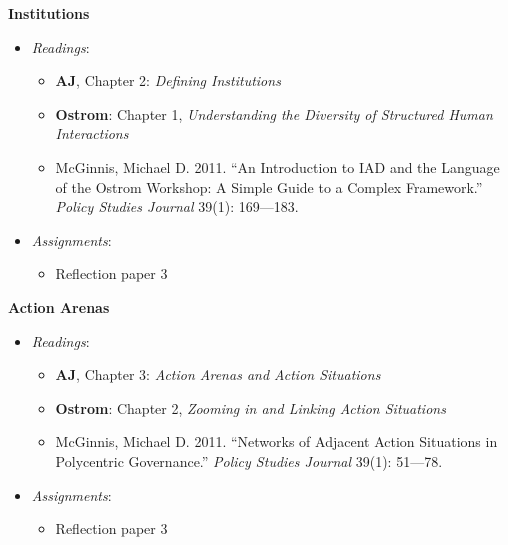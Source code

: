 \week \textbf{Institutions}

\begin{itemize}

\item
  \emph{Readings}:

  \begin{itemize}
  
  \item
    \textbf{AJ}, Chapter 2: \emph{Defining Institutions}
  \item
    \textbf{Ostrom}: Chapter 1, \emph{Understanding the Diversity of
    Structured Human Interactions}
  \item
    McGinnis, Michael D. 2011. ``An Introduction to IAD and the Language
    of the Ostrom Workshop: A Simple Guide to a Complex Framework.''
    \emph{Policy Studies Journal} 39(1): 169---183.
  \end{itemize}
\item
  \emph{Assignments}:

  \begin{itemize}
  
  \item
    Reflection paper 3
  \end{itemize}
\end{itemize}

\week \textbf{Action Arenas}

\begin{itemize}

\item
  \emph{Readings}:

  \begin{itemize}
  
  \item
    \textbf{AJ}, Chapter 3: \emph{Action Arenas and Action Situations}
  \item
    \textbf{Ostrom}: Chapter 2, \emph{Zooming in and Linking Action
    Situations}
  \item
    McGinnis, Michael D. 2011. ``Networks of Adjacent Action Situations
    in Polycentric Governance.'' \emph{Policy Studies Journal} 39(1):
    51---78.
  \end{itemize}
\item
  \emph{Assignments}:

  \begin{itemize}
  
  \item
    Reflection paper 3
  \end{itemize}
\end{itemize}

